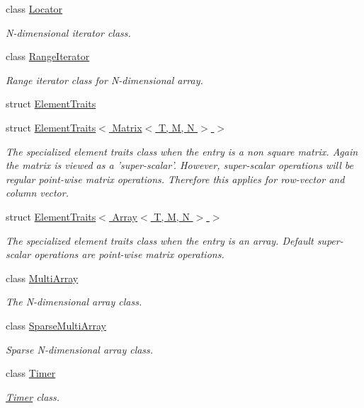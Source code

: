 \begin{DoxyCompactItemize}
class \hyperlink{class_d_o_1_1_locator}{Locator}
\begin{DoxyCompactList}\small\item\em N-\/dimensional iterator class. \end{DoxyCompactList}\item 
class \hyperlink{class_d_o_1_1_range_iterator}{Range\-Iterator}
\begin{DoxyCompactList}\small\item\em Range iterator class for N-\/dimensional array. \end{DoxyCompactList}\item 
struct \hyperlink{struct_d_o_1_1_element_traits}{Element\-Traits}
\item 
struct \hyperlink{struct_d_o_1_1_element_traits_3_01_matrix_3_01_t_00_01_m_00_01_n_01_4_01_4}{Element\-Traits$<$ Matrix$<$ T, M, N $>$ $>$}
\begin{DoxyCompactList}\small\item\em The specialized element traits class when the entry is a non square matrix. Again the matrix is viewed as a 'super-\/scalar'. However, super-\/scalar operations will be regular point-\/wise matrix operations. Therefore this applies for row-\/vector and column vector. \end{DoxyCompactList}\item 
struct \hyperlink{struct_d_o_1_1_element_traits_3_01_array_3_01_t_00_01_m_00_01_n_01_4_01_4}{Element\-Traits$<$ Array$<$ T, M, N $>$ $>$}
\begin{DoxyCompactList}\small\item\em The specialized element traits class when the entry is an array. Default super-\/scalar operations are point-\/wise matrix operations. \end{DoxyCompactList}\item 
class \hyperlink{class_d_o_1_1_multi_array}{Multi\-Array}
\begin{DoxyCompactList}\small\item\em The N-\/dimensional array class. \end{DoxyCompactList}\item 
class \hyperlink{class_d_o_1_1_sparse_multi_array}{Sparse\-Multi\-Array}
\begin{DoxyCompactList}\small\item\em Sparse N-\/dimensional array class. \end{DoxyCompactList}\item 
class \hyperlink{class_d_o_1_1_timer}{Timer}
\begin{DoxyCompactList}\small\item\em \hyperlink{class_d_o_1_1_timer}{Timer} class. \end{DoxyCompactList}\item 

\end{DoxyCompactItemize}

